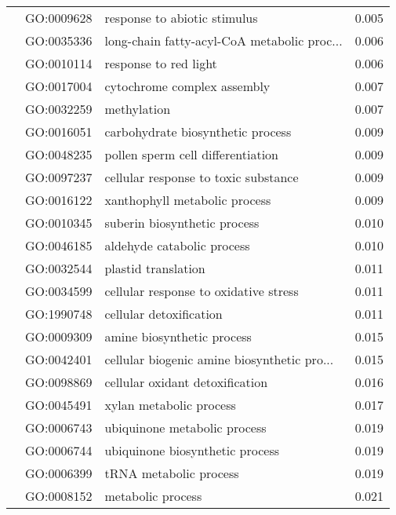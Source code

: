 \begin{longtable}{lllr}
   & GO:0009628 &                 response to abiotic stimulus &         0.005 \\
   & GO:0035336 &  long-chain fatty-acyl-CoA metabolic proc... &         0.006 \\
   & GO:0010114 &                        response to red light &         0.006 \\
   & GO:0017004 &                  cytochrome complex assembly &         0.007 \\
   & GO:0032259 &                                  methylation &         0.007 \\
   & GO:0016051 &            carbohydrate biosynthetic process &         0.009 \\
   & GO:0048235 &            pollen sperm cell differentiation &         0.009 \\
   & GO:0097237 &         cellular response to toxic substance &         0.009 \\
   & GO:0016122 &                xanthophyll metabolic process &         0.009 \\
   & GO:0010345 &                 suberin biosynthetic process &         0.010 \\
   & GO:0046185 &                   aldehyde catabolic process &         0.010 \\
   & GO:0032544 &                          plastid translation &         0.011 \\
   & GO:0034599 &        cellular response to oxidative stress &         0.011 \\
   & GO:1990748 &                      cellular detoxification &         0.011 \\
   & GO:0009309 &                   amine biosynthetic process &         0.015 \\
   & GO:0042401 &  cellular biogenic amine biosynthetic pro... &         0.015 \\
   & GO:0098869 &              cellular oxidant detoxification &         0.016 \\
   & GO:0045491 &                      xylan metabolic process &         0.017 \\
   & GO:0006743 &                 ubiquinone metabolic process &         0.019 \\
   & GO:0006744 &              ubiquinone biosynthetic process &         0.019 \\
   & GO:0006399 &                       tRNA metabolic process &         0.019 \\
   & GO:0008152 &                            metabolic process &         0.021 \\

\end{longtable}
